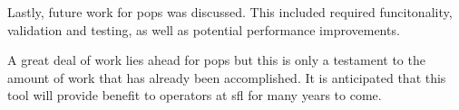 Lastly, future work for \gls{pops} was discussed. This included required
funcitonality, validation and testing, as well as potential performance
improvements.


A great deal of work lies ahead for \gls{pops} but this is only a testament to
the amount of work that has already been accomplished. It is anticipated that
this tool will provide benefit to operators at \gls{sfl} for many years to
come.










